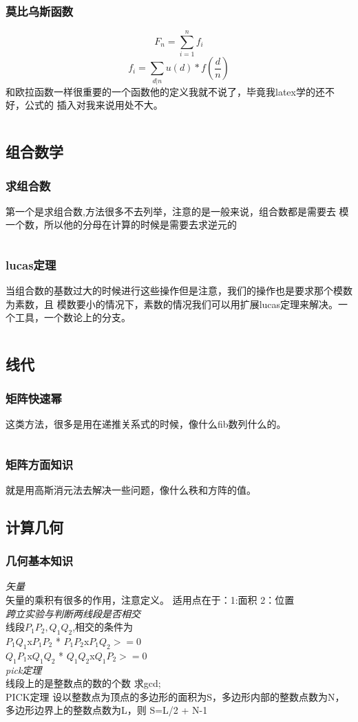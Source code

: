 \documentclass[a4paper,11pt]{article}
\begin{document}
\begin{CJK}{UTF8}{gbsn}
\subsubsection{莫比乌斯函数}
$$ F_n = \sum_{i=1}^n f_i $$
$$ f_i = \sum_{d|n} u(d)*f(\frac{d}{n}) $$
和欧拉函数一样很重要的一个函数他的定义我就不说了，毕竟我latex学的还不好，公式的
插入对我来说用处不大。
\inputminted{c++}{../scoure/math/mobius.cpp}
\newpage
\subsection{组合数学}
\subsubsection{求组合数}
第一个是求组合数,方法很多不去列举，注意的是一般来说，组合数都是需要去
模一个数，所以他的分母在计算的时候是需要去求逆元的
\inputminted{c++}{../scoure/math/zuhe.cpp}
\subsubsection{lucas定理}
当组合数的基数过大的时候进行这些操作但是注意，我们的操作也是要求那个模数为素数，且
模数要小的情况下，素数的情况我们可以用扩展lucas定理来解决。一个工具，一个数论上的分支。
\inputminted{c++}{../scoure/math/lucas.cpp}
\subsection{线代}
\subsubsection{矩阵快速幂}
这类方法，很多是用在递推关系式的时候，像什么fib数列什么的。
\inputminted{c++}{../scoure/math/ju_quick.cpp}
\subsubsection{矩阵方面知识}
就是用高斯消元法去解决一些问题，像什么秩和方阵的值。
\subsection{计算几何}
\subsubsection{几何基本知识}
\emph{矢量}\\
矢量的乘积有很多的作用，注意定义。
适用点在于：1:面积 2：位置\\
\emph{跨立实验与判断两线段是否相交}\\
线段$P_1P_2,Q_1Q_2$,相交的条件为\\
$P_1Q_1$x$P_1P_2$  *  $P_1P_2$x$P_1Q_2>=0$\\
$Q_1P_1$x$Q_1Q_2$  *  $Q_1Q_2$x$Q_1P_2>=0$\\
\emph{pick定理}\\
线段上的是整数点的数的个数 求gcd;\\
PICK定理 设以整数点为顶点的多边形的面积为S，多边形内部的整数点数为N，多边形边界上的整数点数为L，则 S=L/2 + N-1
\\

\end{CJK}
\end{document}
